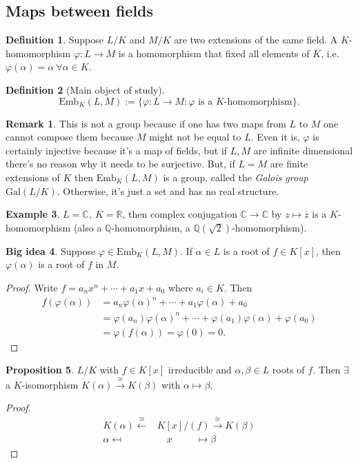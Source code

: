 \documentclass[a4paper]{article}
\newcommand{\Q}{\mathbb Q}
\newcommand{\C}{\mathbb C}
\newcommand{\R}{\mathbb R}
\newcommand{\gal}{\text{Gal}}
\newcommand{\emb}{\text{Emb}}
\theoremstyle{definition}
\newtheorem{defn}{Definition}[subsection]
\newtheorem{prop}[defn]{Proposition}
\newtheorem{example}[defn]{Example}
\newtheorem{idea}[defn]{Big idea}
\newtheorem*{remark}{Remark}
\begin{document}
\subsection{Maps between fields}
\begin{defn}
Suppose $L/K$ and $M/K$ are two extensions of the same field. A $K$-homomorphism $\varphi:L\rightarrow M$ is a homomorphism that fixed all elements of $K$, i.e. $\varphi(\alpha)=\alpha \ \forall\alpha\in K$.
\end{defn}

\begin{defn}[Main object of study]
\[
\emb_K(L,M):=\{\varphi:L\rightarrow M:\varphi \text{ is a }K\text{-homomorphism}\}.
\]
\end{defn}

\begin{remark}
This is not a group because if one has two maps from $L$ to $M$ one cannot compose them because $M$ might not be equal to $L$. Even it is, $\varphi$ is certainly injective because it's a map of fields, but if $L,M$ are infinite dimensional there's no reason why it needs to be surjective. But, if $L=M$ are finite extensions of $K$ then $\emb_K(L,M)$ is a group, called the \textit{Galois group} $\gal(L/K)$. Otherwise, it's just a set and has no real structure.
\end{remark}
\begin{example}
$L=\C,\ K=\R$, then complex conjugation $\C\rightarrow\C$ by $z\mapsto \overline z$ is a $K$-homomorphism (also a $\Q$-homomorphism, a $\Q\left(\sqrt 2\right)$-homomorphism).
\end{example}

\begin{idea}
\label{idea:phialphaisaroot}
Suppose $\varphi\in\emb_K(L,M)$. If $\alpha\in L$ is a root of $f\in K[x]$, then $\varphi(\alpha)$ is a root of $f$ in $M$.
\begin{proof}
Write $f=a_nx^n+\cdots+a_1x+a_0$ where $a_i\in K$. Then
\[
\begin{aligned}
f(\varphi(\alpha))&=a_n \varphi(\alpha)^n+\cdots+a_1\varphi(\alpha)+a_0\\
&=\varphi(a_n)\varphi(\alpha)^n+\cdots+\varphi(a_1)\varphi(\alpha)+\varphi(a_0)\\
&=\varphi(f(\alpha))=\varphi(0)=0.
\end{aligned}
\]
\end{proof}
\end{idea}

\begin{prop}
\label{prop:irredhasisotakesroottoanother}
$L/K$ with $f\in K[x]$ irreducible and $\alpha,\beta\in L$ roots of $f$. Then $\exists$ a $K$-isomorphism $K(\alpha)\xrightarrow{\cong} K(\beta)$ with $\alpha\mapsto\beta$.
\end{prop}
\begin{proof}
\[
\begin{aligned}
K(\alpha) \xleftarrow{\cong} &K[x]/(f) \xrightarrow{\cong} K(\beta) \\
\alpha \mapsfrom &\quad x\qquad\ \ \mapsto \beta
\end{aligned}
\]
\end{proof}
\end{document}
